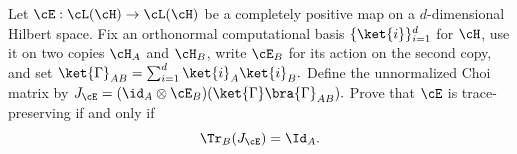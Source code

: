 Let $\cE:\cL(\cH)\to\cL(\cH)$ be a completely positive map on a
$d$-dimensional Hilbert space. Fix an orthonormal computational basis
$\{\ket{i}\}_{i=1}^d$ for $\cH$, use it on two copies $\cH_A$ and $\cH_B$, write $\cE_B$ for its action on the second copy, and set $\ket{\Gamma}_{AB}=\sum_{i=1}^{d}\ket{i}_A\ket{i}_B.$ Define the unnormalized Choi matrix by $J_{\cE}=(\id_A\otimes\cE_B)(\ket{\Gamma}\bra{\Gamma}_{AB}).$ Prove that $\cE$ is trace-preserving if and only if
$$
\Tr_B(J_{\cE})=\Id_A.
$$
